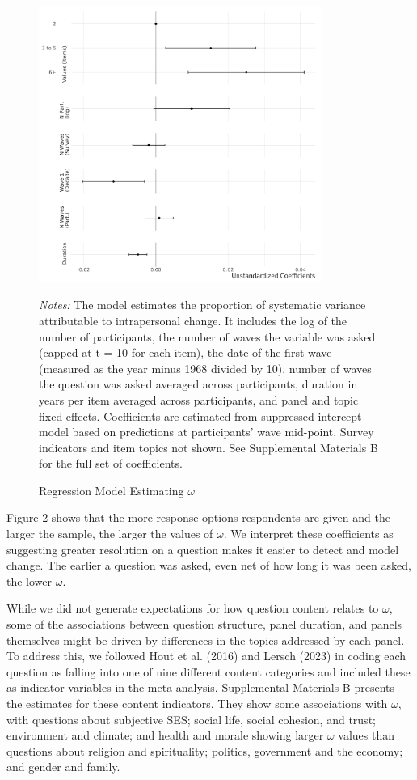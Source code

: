 \documentclass[
  12pt,
]{article}
\begin{document}
\begin{figure}[htp]
\begin{center}
\caption{Regression Model Estimating $\omega$}

\includegraphics[width=350px]{../figures/figure_2}

\end{center}
\footnotesize{\textit{Notes:} The model estimates the proportion of systematic variance attributable to intrapersonal change. It includes the log of the number of participants, the number of waves the variable was asked (capped at t = 10 for each item), the date of the first wave (measured as the year minus 1968 divided by 10), number of waves the question was asked averaged across participants, duration in years per item averaged across participants, and panel and topic fixed effects. Coefficients are estimated from suppressed intercept model based on predictions at participants' wave mid-point. Survey indicators and item topics not shown. See Supplemental Materials B for the full set of coefficients.}
\end{figure}

Figure 2 shows that the more response options respondents are given and
the larger the sample, the larger the values of \(\omega\). We interpret
these coefficients as suggesting greater resolution on a question makes
it easier to detect and model change. The earlier a question was asked,
even net of how long it was been asked, the lower \(\omega\).

While we did not generate expectations for how question content relates
to \(\omega\), some of the associations between question structure,
panel duration, and panels themselves might be driven by differences in
the topics addressed by each panel. To address this, we followed Hout et
al. (2016) and Lersch (2023) in coding each question as falling into one
of nine different content categories and included these as indicator
variables in the meta analysis. Supplemental Materials B presents the
estimates for these content indicators. They show some associations with
\(\omega\), with questions about subjective SES; social life, social
cohesion, and trust; environment and climate; and health and morale
showing larger \(\omega\) values than questions about religion and
spirituality; politics, government and the economy; and gender and
family.
\end{document}
